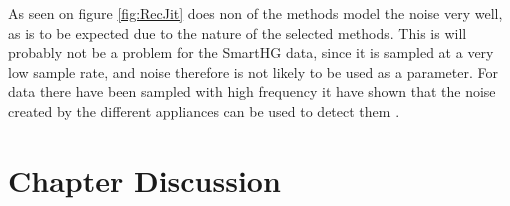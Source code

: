 As seen on figure \ref{fig:RecJit} does non of the methods model the noise very well, as is to be expected due to the nature of the selected methods. This is will probably not be a problem for the SmartHG data, since it is sampled at a very low sample rate, and noise therefore is not likely to be used as a parameter. For data there have been sampled with high frequency it have shown that the noise created by the different appliances can be used to detect them \citep{RefWorks:17}. 

\section{Chapter Discussion}






